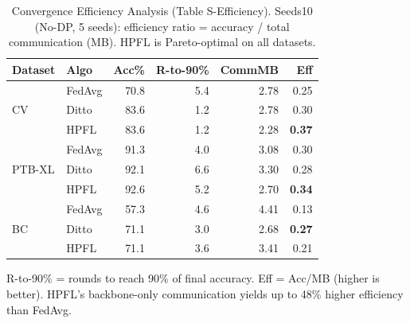\documentclass[conference]{IEEEtran}
\begin{document}
\begin{table}[!ht]
\centering
\caption{Convergence Efficiency Analysis (Table S-Efficiency). Seeds10 (No-DP, 5 seeds): efficiency ratio = accuracy / total communication (MB). HPFL is Pareto-optimal on all datasets.}
\label{tab:s_efficiency}
\scriptsize
\begin{tabular}{llrrrr}
\toprule
\textbf{Dataset} & \textbf{Algo} & \textbf{Acc\%} & \textbf{R-to-90\%} & \textbf{CommMB} & \textbf{Eff} \\
\midrule
\multirow{3}{*}{CV} & FedAvg & 70.8 & 5.4 & 2.78 & 0.25 \\
 & Ditto & 83.6 & 1.2 & 2.78 & 0.30 \\
 & HPFL & 83.6 & 1.2 & 2.28 & \textbf{0.37} \\
\midrule
\multirow{3}{*}{PTB-XL} & FedAvg & 91.3 & 4.0 & 3.08 & 0.30 \\
 & Ditto & 92.1 & 6.6 & 3.30 & 0.28 \\
 & HPFL & 92.6 & 5.2 & 2.70 & \textbf{0.34} \\
\midrule
\multirow{3}{*}{BC} & FedAvg & 57.3 & 4.6 & 4.41 & 0.13 \\
 & Ditto & 71.1 & 3.0 & 2.68 & \textbf{0.27} \\
 & HPFL & 71.1 & 3.6 & 3.41 & 0.21 \\
\bottomrule
\end{tabular}

\vspace{1mm}
\footnotesize{R-to-90\% = rounds to reach 90\% of final accuracy. Eff = Acc/MB (higher is better). HPFL's backbone-only communication yields up to 48\% higher efficiency than FedAvg.}
\end{table}
\end{document}
